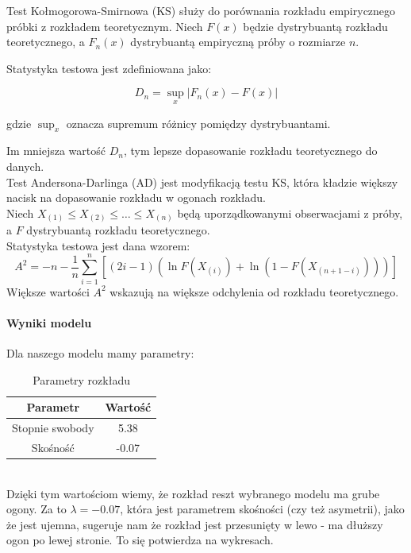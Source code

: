 \documentclass{article}
\begin{document}
{ Test Kołmogorowa-Smirnowa (KS) służy do porównania rozkładu empirycznego próbki z rozkładem teoretycznym. Niech \( F(x) \) będzie dystrybuantą rozkładu teoretycznego, a \( F_n(x) \) dystrybuantą empiryczną próby o rozmiarze \( n \).

Statystyka testowa jest zdefiniowana jako:

\[
D_n = \sup_x \left| F_n(x) - F(x) \right|
\]

gdzie \( \sup_x \) oznacza supremum różnicy pomiędzy dystrybuantami.

Im mniejsza wartość \( D_n \), tym lepsze dopasowanie rozkładu teoretycznego do danych. \\

 Test Andersona-Darlinga (AD) jest modyfikacją testu KS, która kładzie większy nacisk na dopasowanie rozkładu w ogonach rozkładu. \\

Niech \( X_{(1)} \leq X_{(2)} \leq \dots \leq X_{(n)} \) będą uporządkowanymi obserwacjami z próby, a \( F \) dystrybuantą rozkładu teoretycznego. \\ 

Statystyka testowa jest dana wzorem:
\[
A^2 = -n - \frac{1}{n} \sum_{i=1}^n \left[ (2i - 1) \left( \ln F(X_{(i)}) + \ln \left( 1 - F(X_{(n+1-i)}) \right) \right) \right]
\]
Większe wartości \( A^2 \) wskazują na większe odchylenia od rozkładu teoretycznego.

\paragraph{Wyniki modelu}
Dla naszego modelu mamy parametry: 
\begin{table}[h]
    \centering
    \caption{Parametry rozkładu}
    \begin{tabular}{|c|c|}
    \hline
    \textbf{Parametr} & \textbf{Wartość} \\
    \hline
    Stopnie swobody & 5.38 \\
    Skośność & -0.07 \\
    \hline
    \end{tabular}
\end{table} \\
Dzięki tym wartościom wiemy, że rozkład reszt wybranego modelu ma grube ogony. Za to $\lambda = -0.07$, która jest parametrem skośności (czy też asymetrii), jako że jest ujemna, sugeruje nam że rozkład jest przesunięty w lewo - ma dłuższy ogon po lewej stronie. To się potwierdza na wykresach. \\

}
\end{document}
